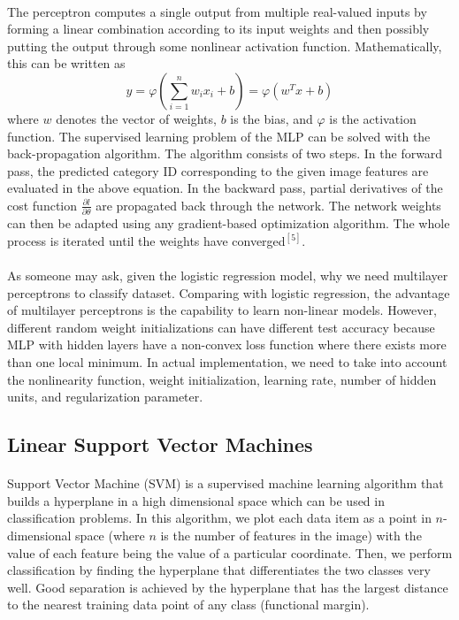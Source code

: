 \documentclass{article}
\begin{document}
\paragraph{}
The perceptron computes a single output from multiple real-valued inputs by forming a linear combination according to its input weights and then possibly putting the output through some nonlinear activation function. Mathematically, this can be written as 
\[ y = \varphi(\sum_{i=1}^n w_ix_i+b) = \varphi(w^Tx+b)
\]
where $w$ denotes the vector of weights, $b$ is the bias, and $\varphi$ is the activation function. The supervised learning problem of the MLP can be solved with the back-propagation algorithm. The algorithm consists of two steps. In the forward pass, the predicted category ID corresponding to the given image features are evaluated in the above equation. In the backward pass, partial derivatives of the cost function $\frac{\partial l}{\partial \theta}$  are propagated back through the network. The network weights can then be adapted using any gradient-based optimization algorithm. The whole process is iterated until the weights have converged$^{[5]}$.

\paragraph{}
As someone may ask, given the logistic regression model, why we need multilayer perceptrons to classify dataset. Comparing with logistic regression, the advantage of multilayer perceptrons is the capability to learn non-linear models. However, different random weight initializations can have different test accuracy because MLP with hidden layers have a non-convex loss function where there exists more than one local minimum. In actual implementation, we need to take into account the nonlinearity function, weight initialization, learning rate, number of hidden units, and regularization parameter.


\subsection{Linear Support Vector Machines}
\paragraph{}
Support Vector Machine (SVM) is a supervised machine learning algorithm that builds a hyperplane in a high dimensional space which can be used in classification problems. In this algorithm, we plot each data item as a point in $n$-dimensional space (where $n$ is the number of features in the image) with the value of each feature being the value of a particular coordinate. Then, we perform classification by finding the hyperplane that differentiates the two classes very well. Good separation is achieved by the hyperplane that has the largest distance to the nearest training data point of any class (functional margin).
\end{document}
